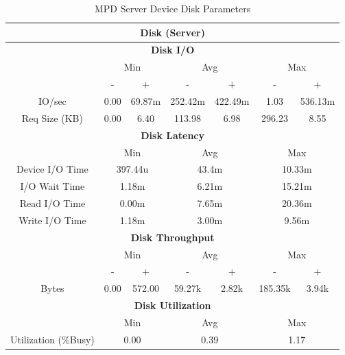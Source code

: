 \documentclass[11pt,a4paper]{scrreprt}
\begin{document}
\begin{table}[H]
\centering
    \begin{tabular}{||c|c|c|c|c|c|c||}
    \hline
    \multicolumn{7}{|c|}{\textbf{Disk (Server)}} \\
    \hline
    \multicolumn{7}{|c|}{\textbf{Disk I/O}} \\
    \hline\hline
      & \multicolumn{2}{|c|}{Min} & \multicolumn{2}{|c|}{Avg} & \multicolumn{2}{|c|}{Max} \\
    \hline
      & - & + & - & + & - & + \\
    \hline
    IO/sec & 0.00 & 69.87m & 252.42m & 422.49m & 1.03 & 536.13m \\
    \hline
    Req Size (KB) & 0.00 & 6.40 & 113.98 & 6.98 & 296.23 & 8.55 \\
    \hline\hline
    \multicolumn{7}{|c|}{\textbf{Disk Latency}} \\
    \hline\hline
      & \multicolumn{2}{|c|}{Min} & \multicolumn{2}{|c|}{Avg} & \multicolumn{2}{|c|}{Max} \\
    \hline
    Device I/O Time  & \multicolumn{2}{|c|}{397.44u} & \multicolumn{2}{|c|}{43.4m} & \multicolumn{2}{|c|}{10.33m} \\
    \hline
    I/O Wait Time  & \multicolumn{2}{|c|}{1.18m} & \multicolumn{2}{|c|}{6.21m} & \multicolumn{2}{|c|}{15.21m} \\
    \hline
    Read I/O Time  & \multicolumn{2}{|c|}{0.00m} & \multicolumn{2}{|c|}{7.65m} & \multicolumn{2}{|c|}{20.36m} \\
    \hline
    Write I/O Time  & \multicolumn{2}{|c|}{1.18m} & \multicolumn{2}{|c|}{3.00m} & \multicolumn{2}{|c|}{9.56m} \\
    \hline\hline
    \multicolumn{7}{|c|}{\textbf{Disk Throughput}} \\
    \hline\hline
      & \multicolumn{2}{|c|}{Min} & \multicolumn{2}{|c|}{Avg} & \multicolumn{2}{|c|}{Max} \\
    \hline
      & - & + & - & + & - & + \\
    \hline
    Bytes & 0.00 & 572.00 & 59.27k & 2.82k & 185.35k & 3.94k \\
    \hline\hline
    \multicolumn{7}{|c|}{\textbf{Disk Utilization}} \\
    \hline\hline
      & \multicolumn{2}{|c|}{Min} & \multicolumn{2}{|c|}{Avg} & \multicolumn{2}{|c|}{Max} \\
    \hline
    Utilization (\%Busy)  & \multicolumn{2}{|c|}{0.00} & \multicolumn{2}{|c|}{0.39} & \multicolumn{2}{|c|}{1.17} \\
    \hline\hline
    \end{tabular}
    \caption{MPD Server Device Disk Parameters}
    \label{MPDserverDiskTab}
\end{table}
\end{document}
